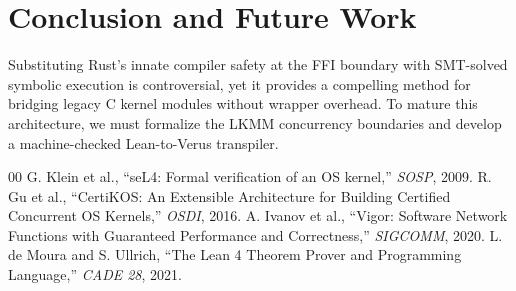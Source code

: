 \documentclass[10pt,journal,compsoc]{IEEEtran}
\begin{document}
\section{Conclusion and Future Work}
Substituting Rust's innate compiler safety at the FFI boundary with SMT-solved symbolic execution is controversial, yet it provides a compelling method for bridging legacy C kernel modules without wrapper overhead. To mature this architecture, we must formalize the LKMM concurrency boundaries and develop a machine-checked Lean-to-Verus transpiler.

\begin{thebibliography}{00}
 G. Klein et al., ``seL4: Formal verification of an OS kernel,'' \textit{SOSP}, 2009.
 R. Gu et al., ``CertiKOS: An Extensible Architecture for Building Certified Concurrent OS Kernels,'' \textit{OSDI}, 2016.
 A. Ivanov et al., ``Vigor: Software Network Functions with Guaranteed Performance and Correctness,'' \textit{SIGCOMM}, 2020.
 L. de Moura and S. Ullrich, ``The Lean 4 Theorem Prover and Programming Language,'' \textit{CADE 28}, 2021.
\end{thebibliography}
\end{document}
